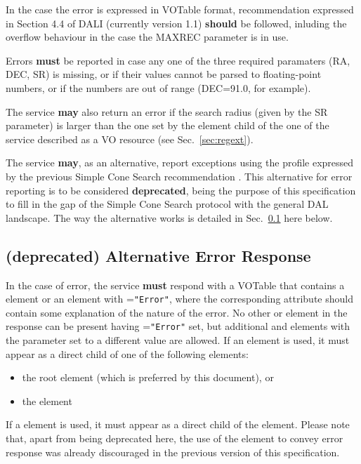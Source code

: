\documentclass[11pt,a4paper]{ivoa}
\begin{document}
In the case the error is expressed in VOTable format, recommendation
expressed in Section 4.4 of DALI (currently version 1.1) \textbf{should}
be followed, inluding the overflow behaviour in the case the MAXREC
parameter is in use.

Errors \textbf{must} be reported in case any one of the three required
paramaters (RA, DEC, SR) is missing, or if their values cannot be parsed
to floating-point numbers, or if the numbers are out of range (DEC=91.0,
for example). 

The service \textbf{may} also return an error if the search radius
(given by the SR parameter) is larger than the one set by the
 element child of the  one of the service
described as a VO resource (see Sec.~\ref{sec:regext}).

The service \textbf{may}, as an alternative, report exceptions using the
profile expressed by the previous Simple Cone Search recommendation
\citep[v1.03]{2008ivoa.specQ0222P}. This alternative for error reporting is to be
considered \textbf{deprecated}, being the purpose of this specification
to fill in the gap of the Simple Cone Search protocol with the general
DAL landscape. The way the alternative works is detailed in
Sec.~\ref{subsec:err103} here below.

\subsection{(\textbf{deprecated}) Alternative Error Response}
\label{subsec:err103} In the case of error, the service \textbf{must}
respond with a VOTable that contains a  element or an
 element with =\texttt{"Error"}, where
the corresponding  attribute should contain some
explanation of the nature of the error. No other  or
 element in the response can be present having
=\texttt{"Error"} set, but additional  and
 elements with the  parameter set to a different value
are allowed. If an  element is
used, it must appear as a direct child of one of the following elements:
\begin{itemize} \item the root  element (which is
preferred by this document), or \item the  element
\end{itemize}

If a  element is used, it must appear as a direct child of
the  element.
Please note
that, apart from being deprecated here, the use of the 
element to convey error response was already discouraged in the previous
version of this specification.
\end{document}

